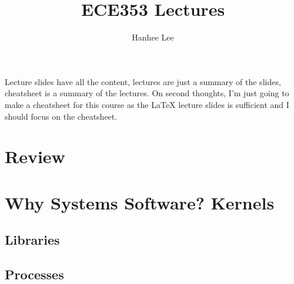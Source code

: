 \documentclass{article}
\title{ECE353 Lectures}
\author{Hanhee Lee}
\begin{document}
\maketitle

\tableofcontents

\begin{summary}
    Lecture slides have all the content, lectures are just a summary of the slides, cheatsheet is a summary of the lectures. On second thoughts, I'm just going to make a cheatsheet for this course as the LaTeX lecture slides is sufficient and I should focus on the cheatsheet.
\end{summary}
\newpage

\section{Review}


\newpage

\section{Why Systems Software? Kernels}


\newpage

\begin{center}
    \section{Libraries}
\end{center}


\newpage

\begin{center}
    \section{Processes}
\end{center}

\end{document}
